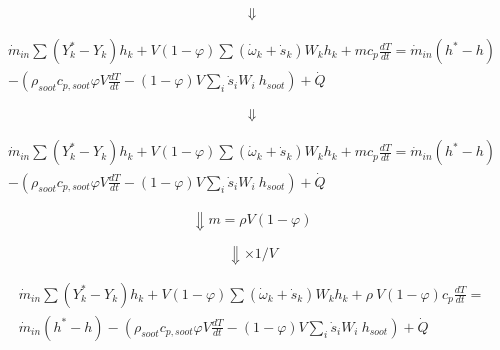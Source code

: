 \begin{equation*}
	\Downarrow
\end{equation*}

\begin{equation*}
	\begin{split}
	{\dot{m}}_{in}\sum\left(Y_k^\ast-Y_k\right)h_k
	+
	V\left(1-\varphi\right)\sum{\left({\dot{\omega}}_k
	+
	{\dot{s}}_k\right)W_kh_k}
	+
	mc_p\frac{dT}{dt}
	=
	{\dot{m}}_{in}\left(h^\ast-h\right)
	\\
	-\left(\rho_{soot}c_{p,soot}\varphi V\frac{dT}{dt}-\left(1-\varphi\right)V\sum_{i}{{\dot{s}}_iW_i}\ h_{soot}\right)+\dot{Q}
	\end{split}
\end{equation*}


\begin{equation*}
	\Downarrow
\end{equation*}


\begin{equation*}
	\begin{split}
		{\dot{m}}_{in}\sum\left(Y_k^\ast-Y_k\right)h_k
		+
		V\left(1-\varphi\right)\sum{\left({\dot{\omega}}_k
			+
			{\dot{s}}_k\right)W_kh_k}
		+
		mc_p\frac{dT}{dt}
		=
		{\dot{m}}_{in}\left(h^\ast-h\right)
		\\
		-\left(\rho_{soot}c_{p,soot}\varphi V\frac{dT}{dt}-\left(1-\varphi\right)V\sum_{i}{{\dot{s}}_iW_i}\ h_{soot}\right)+\dot{Q}
	\end{split}
\end{equation*}


\begin{equation*}
	\Downarrow m=\rho V (1-\varphi) 
\end{equation*}

\begin{equation*}
	\Downarrow \times 1/V
\end{equation*}

\begin{equation*}
	\begin{split}
	{\dot{m}}_{in}\sum\left(Y_k^\ast-Y_k\right)h_k+V\left(1-\varphi\right)\sum{\left({\dot{\omega}}_k+{\dot{s}}_k\right)W_kh_k}+\rho\ V\left(1-\varphi\right)c_p\frac{dT}{dt}=
	\\
	{\dot{m}}_{in}\left(h^\ast-h\right)-\left(\rho_{soot}c_{p,soot}\varphi V\frac{dT}{dt}-\left(1-\varphi\right)V\sum_{i}{{\dot{s}}_iW_i}\ h_{soot}\right)+\dot{Q}
	\end{split}
\end{equation*}


